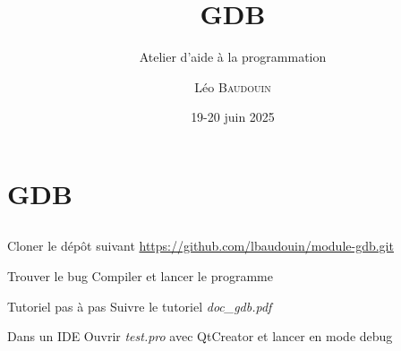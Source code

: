 \documentclass{beamer}
\title{GDB}
\subtitle{Atelier d'aide à la programmation}
\author{L\'eo \textsc{Baudouin}}
\institute{
  {\url{baudouin.leo @ gmail.com}}
}
\date{19-20 juin 2025}
\begin{document}
\begin{frame}
  \titlepage
\end{frame}

\section{GDB}
\subsection{}

\begin{frame}{}

\begin{block}{Cloner le dép\^ot suivant}
\url{https://github.com/lbaudouin/module-gdb.git}
\end{block}

\begin{block}{Trouver le bug}
Compiler et lancer le programme
\end{block}

\begin{block}{Tutoriel pas à pas}
Suivre le tutoriel \emph{doc\_gdb.pdf}\footnotemark
\end{block}

\begin{block}{Dans un IDE}
Ouvrir \emph{test.pro} avec QtCreator et lancer en mode debug
\end{block}


\end{frame}


\end{document}
